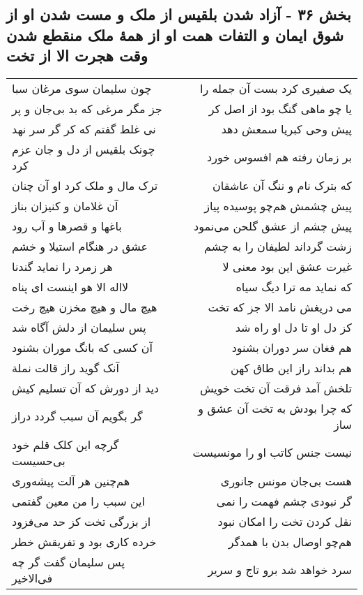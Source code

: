 \begin{center}
\section*{بخش ۳۶ - آزاد شدن بلقیس از ملک و مست  شدن او از شوق ایمان و التفات همت او از همهٔ ملک منقطع شدن وقت هجرت الا از تخت}
\label{sec:sh036}
\begin{longtable}{l p{0.5cm} r}
چون سلیمان سوی مرغان سبا
&&
یک صفیری کرد بست آن جمله را
\\
جز مگر مرغی که بد بی‌جان و پر
&&
یا چو ماهی گنگ بود از اصل کر
\\
نی غلط گفتم که کر گر سر نهد
&&
پیش وحی کبریا سمعش دهد
\\
چونک بلقیس از دل و جان عزم کرد
&&
بر زمان رفته هم افسوس خورد
\\
ترک مال و ملک کرد او آن چنان
&&
که بترک نام و ننگ آن عاشقان
\\
آن غلامان و کنیزان بناز
&&
پیش چشمش هم‌چو پوسیده پیاز
\\
باغها و قصرها و آب رود
&&
پیش چشم از عشق گلحن می‌نمود
\\
عشق در هنگام استیلا و خشم
&&
زشت گرداند لطیفان را به چشم
\\
هر زمرد را نماید گندنا
&&
غیرت عشق این بود معنی لا
\\
لااله الا هو اینست ای پناه
&&
که نماید مه ترا دیگ سیاه
\\
هیچ مال و هیچ مخزن هیچ رخت
&&
می دریغش نامد الا جز که تخت
\\
پس سلیمان از دلش آگاه شد
&&
کز دل او تا دل او راه شد
\\
آن کسی که بانگ موران بشنود
&&
هم فغان سر دوران بشنود
\\
آنک گوید راز قالت نملة
&&
هم بداند راز این طاق کهن
\\
دید از دورش که آن تسلیم کیش
&&
تلخش آمد فرقت آن تخت خویش
\\
گر بگویم آن سبب گردد دراز
&&
که چرا بودش به تخت آن عشق و ساز
\\
گرچه این کلک قلم خود بی‌حسیست
&&
نیست جنس کاتب او را مونسیست
\\
هم‌چنین هر آلت پیشه‌وری
&&
هست بی‌جان مونس جانوری
\\
این سبب را من معین گفتمی
&&
گر نبودی چشم فهمت را نمی
\\
از بزرگی تخت کز حد می‌فزود
&&
نقل کردن تخت را امکان نبود
\\
خرده کاری بود و تفریقش خطر
&&
هم‌چو اوصال بدن با همدگر
\\
پس سلیمان گفت گر چه فی‌الاخیر
&&
سرد خواهد شد برو تاج و سریر

\end{longtable}
\end{center}
